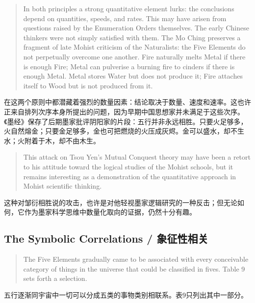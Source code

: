 \documentclass[UTF8,zihao=-4]{ctexart}
\newenvironment{enblock}
  {\par\smallskip\noindent{\scriptsize\bfseries English}\par\begin{quote}\small}
  {\end{quote}}
\newenvironment{zhblock}
  {\par\noindent{\scriptsize\bfseries 中文}\par}
  {\par\medskip}
\begin{document}
\begin{enblock}
In both principles a strong quantitative element lurks: the conclusions depend on quantities, speeds, and rates. This may have arisen from questions raised by the Enumeration Orders themselves. The early Chinese thinkers were not simply satisfied with them. The Mo Ching preserves a fragment of late Mohist criticism of the Naturalists: the Five Elements do not perpetually overcome one another. Fire naturally melts Metal if there is enough Fire; Metal can pulverise a burning fire to cinders if there is enough Metal. Metal stores Water but does not produce it; Fire attaches itself to Wood but is not produced from it.
\end{enblock}
\begin{zhblock}
在这两个原则中都潜藏着强烈的数量因素：结论取决于数量、速度和速率。这也许正来自排列次序本身所提出的问题，因为早期中国思想家并未满足于这些次序。《墨经》保存了后期墨家批评阴阳家的片段：五行并非永远相胜。只要火足够多，火自然熔金；只要金足够多，金也可把燃烧的火压成灰烬。金可以盛水，却不生水；火附着于木，却不由木生。
\end{zhblock}

\begin{enblock}
This attack on Tsou Yen's Mutual Conquest theory may have been a retort to his attitude toward the logical studies of the Mohist schools, but it remains interesting as a demonstration of the quantitative approach in Mohist scientific thinking.
\end{enblock}
\begin{zhblock}
这种对邹衍相胜说的攻击，也许是对他轻视墨家逻辑研究的一种反击；但无论如何，它作为墨家科学思维中数量化取向的证据，仍然十分有趣。
\end{zhblock}

\subsection*{The Symbolic Correlations / 象征性相关}

\begin{enblock}
The Five Elements gradually came to be associated with every conceivable category of things in the universe that could be classified in fives. Table 9 sets forth a selection.
\end{enblock}
\begin{zhblock}
五行逐渐同宇宙中一切可以分成五类的事物类别相联系。表9只列出其中一部分。
\end{zhblock}
\end{document}
